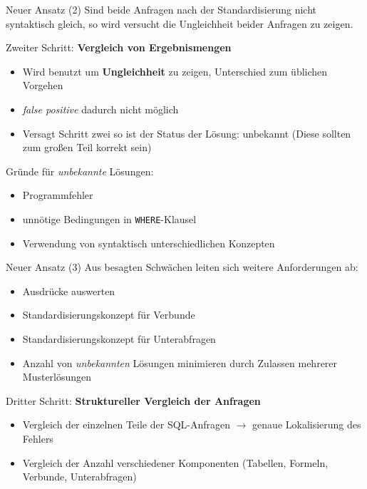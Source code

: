 \documentclass{beamer}
\begin{document}
\begin{frame}[fragile]{Neuer Ansatz (2)}
Sind beide Anfragen nach der Standardisierung nicht syntaktisch gleich, so wird versucht die Ungleichheit beider Anfragen zu zeigen.

Zweiter Schritt: \textbf{Vergleich von Ergebnismengen}
\begin{itemize}
\item Wird benutzt um \textbf{Ungleichheit} zu zeigen, Unterschied zum üblichen Vorgehen
\item \textit{false positive} dadurch nicht möglich
\item Versagt Schritt zwei so ist der Status der Lösung: unbekannt (Diese sollten zum großen Teil korrekt sein)
\end{itemize}

Gründe für \textit{unbekannte} Lösungen:

\begin{itemize}
\item Programmfehler
\item unnötige Bedingungen in \verb|WHERE|-Klausel
\item Verwendung von syntaktisch unterschiedlichen Konzepten 
\end{itemize}

\end{frame}

\begin{frame}[fragile]{Neuer Ansatz (3)}
Aus besagten Schwächen leiten sich weitere Anforderungen ab:
\begin{itemize}
\item Ausdrücke auswerten
\item Standardisierungskonzept für Verbunde
\item Standardisierungskonzept für Unterabfragen
\item Anzahl von \textit{unbekannten} Lösungen minimieren durch Zulassen mehrerer Musterlösungen
\end{itemize}
\vspace{5mm}
Dritter Schritt: \textbf{Struktureller Vergleich der Anfragen}
\begin{itemize}
\item Vergleich der einzelnen Teile der SQL-Anfragen $\to$ genaue Lokalisierung des Fehlers
\item Vergleich der Anzahl verschiedener Komponenten (Tabellen, Formeln, Verbunde, Unterabfragen)
\end{itemize}

\end{frame}
\end{document}
